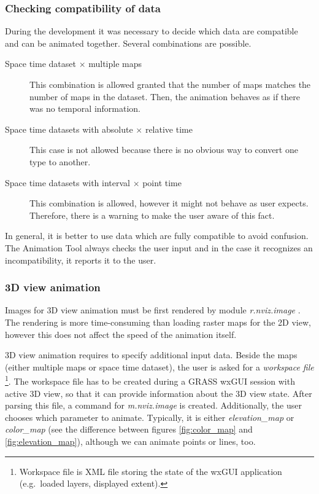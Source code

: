 \documentclass[a4paper,12pt]{book}
\newcommand{\module}[1]{\textsl{#1}}
\newcommand{\at}{Animation Tool\xspace}
\begin{document}
\subsubsection{Checking compatibility of data}
During the development it was necessary to decide which data are compatible and can be animated together.
Several combinations are possible.
\begin{description}
  \item[Space time dataset $\times$ multiple maps]
  This combination is allowed granted that the number of maps matches the number of maps in the dataset.
  Then, the animation behaves as if there was no temporal information.

  \item[Space time datasets with absolute $\times$ relative time]
  This case is not allowed because there is no obvious way to convert one type to another.

  \item[Space time datasets with interval $\times$ point time]
  This combination is allowed, however it might not behave as user expects.
  Therefore, there is a warning to make the user aware of this fact.
 \end{description}
 
In general, it is better to use data which are fully compatible to avoid confusion.
The \at always checks the user input and in the case it recognizes an incompatibility, it reports it to the user.


\subsubsection{3D view animation}
\label{sec:3dViewAnimation}
Images for 3D view animation must be first rendered by module \module{r.nviz.image} \cite{grassUserMan}.
The rendering is more time-consuming than loading raster maps for the 2D view,
however this does not affect the speed of the animation itself.

3D view animation requires to specify additional input data.
Beside the maps (either multiple maps or space time dataset), the user is asked for a \emph{workspace file}%
\footnote{Workspace file is XML file storing the state of the wxGUI application (e.g.\ loaded layers, displayed extent).}.
The workspace file has to be created during a GRASS wxGUI session with active 3D view,
so that it can provide information about the 3D view state. After parsing this file, a command for \module{m.nviz.image}
is created.
Additionally, the user chooses which parameter to animate.
Typically, it is either \emph{elevation\_map} or \emph{color\_map}
(see the difference between figures \ref{fig:color_map} and \ref{fig:elevation_map}),
although we can animate points or lines, too.
\end{document}

